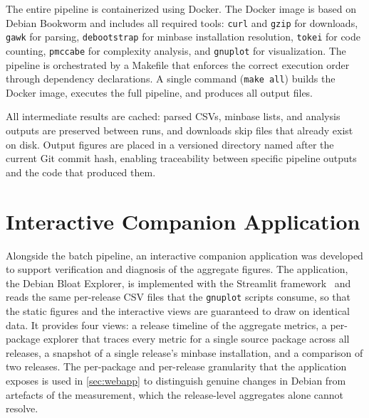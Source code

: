 The entire pipeline is containerized using Docker. The Docker image is based on Debian Bookworm and includes all required tools: \texttt{curl} and \texttt{gzip} for downloads, \texttt{gawk} for parsing, \texttt{debootstrap} for minbase installation resolution, \texttt{tokei} for code counting, \texttt{pmccabe} for complexity analysis, and \texttt{gnuplot} for visualization. The pipeline is orchestrated by a Makefile that enforces the correct execution order through dependency declarations. A single command (\texttt{make all}) builds the Docker image, executes the full pipeline, and produces all output files.

All intermediate results are cached: parsed CSVs, minbase lists, and analysis outputs are preserved between runs, and downloads skip files that already exist on disk. Output figures are placed in a versioned directory named after the current Git commit hash, enabling traceability between specific pipeline outputs and the code that produced them.

\section{Interactive Companion Application}
\label{sec:companion-app}

Alongside the batch pipeline, an interactive companion application was developed to support verification and diagnosis of the aggregate figures. The application, the Debian Bloat Explorer, is implemented with the Streamlit framework~\cite{streamlit} and reads the same per-release CSV files that the \texttt{gnuplot} scripts consume, so that the static figures and the interactive views are guaranteed to draw on identical data. It provides four views: a release timeline of the aggregate metrics, a per-package explorer that traces every metric for a single source package across all releases, a snapshot of a single release's minbase installation, and a comparison of two releases. The per-package and per-release granularity that the application exposes is used in \autoref{sec:webapp} to distinguish genuine changes in Debian from artefacts of the measurement, which the release-level aggregates alone cannot resolve.
